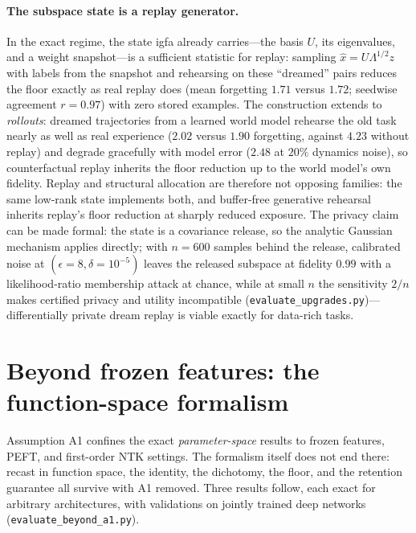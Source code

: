 \documentclass[10pt,a4paper]{article}
\theoremstyle{plain}
\theoremstyle{definition}
\newcommand{\IGFA}{igfa}
\begin{document}
\paragraph{The subspace state is a replay generator.} In the exact regime, the state
\IGFA{} already carries---the basis $U$, its eigenvalues, and a weight snapshot---is a
sufficient statistic for replay: sampling $\hat x=U\Lambda^{1/2}z$ with labels from the
snapshot and rehearsing on these ``dreamed'' pairs reduces the floor exactly as real replay
does (mean forgetting $1.71$ versus $1.72$; seedwise agreement $r=0.97$) with zero stored
examples. The construction extends to \emph{rollouts}: dreamed trajectories from a learned
world model rehearse the old task nearly as well as real experience ($2.02$ versus $1.90$
forgetting, against $4.23$ without replay) and degrade gracefully with model error ($2.48$
at $20\%$ dynamics noise), so counterfactual replay inherits the floor reduction up to the
world model's own fidelity. Replay and structural allocation are therefore not opposing
families: the same low-rank state implements both, and buffer-free generative rehearsal
inherits replay's floor reduction at sharply reduced exposure. The privacy claim can be
made formal: the state is a covariance release, so the analytic Gaussian mechanism applies
directly; with $n=600$ samples behind the release, calibrated noise at
$(\epsilon{=}8,\delta{=}10^{-5})$ leaves the released subspace at fidelity $0.99$ with a
likelihood-ratio membership attack at chance, while at small $n$ the sensitivity $2/n$
makes certified privacy and utility incompatible
(\texttt{evaluate\_upgrades.py})---differentially private dream replay is viable exactly
for data-rich tasks.

\section{Beyond frozen features: the function-space formalism}
\label{si:beyond}
Assumption A1 confines the exact \emph{parameter-space} results to frozen features, PEFT,
and first-order NTK settings. The formalism itself does not end there: recast in function
space, the identity, the dichotomy, the floor, and the retention guarantee all survive with
A1 removed. Three results follow, each exact for arbitrary architectures, with validations
on jointly trained deep networks (\texttt{evaluate\_beyond\_a1.py}).
\end{document}
